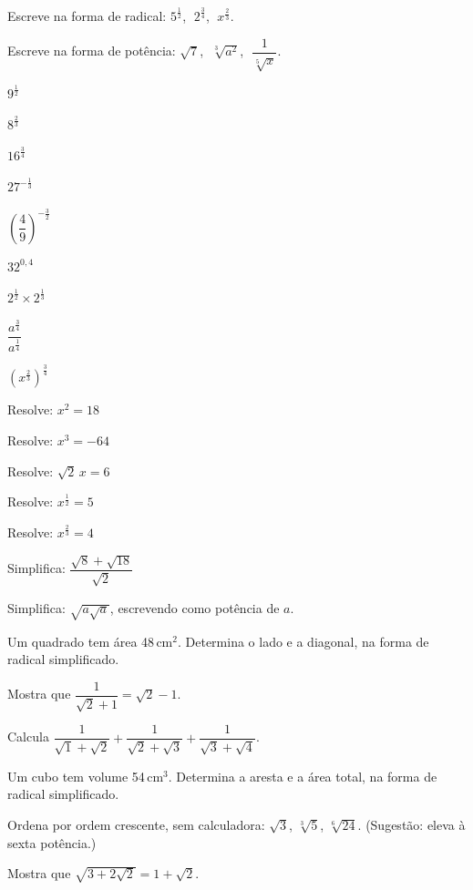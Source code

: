 \documentclass[12pt]{article}
\begin{document}
\begin{exercicios}
  \item Escreve na forma de radical: $5^{\frac{1}{2}}$, $\;2^{\frac{3}{4}}$, $\;x^{\frac{2}{3}}$.
  \item Escreve na forma de potência: $\sqrt{7}$, $\;\sqrt[3]{a^2}$, $\;\dfrac{1}{\sqrt[5]{x}}$.
  \item $9^{\frac{1}{2}}$
  \item $8^{\frac{2}{3}}$
  \item $16^{\frac{3}{4}}$
  \item $27^{-\frac{1}{3}}$
  \item $\left(\dfrac{4}{9}\right)^{-\frac{3}{2}}$
  \item $32^{0{,}4}$
  \item $2^{\frac{1}{2}} \times 2^{\frac{1}{3}}$
  \item $\dfrac{a^{\frac{3}{4}}}{a^{\frac{1}{4}}}$
  \item $\left(x^{\frac{2}{3}}\right)^{\frac{3}{4}}$
\end{exercicios}

\begin{exercicios}
  \item Resolve: $x^2 = 18$
  \item Resolve: $x^3 = -64$
  \item Resolve: $\sqrt{2}\,x = 6$
  \item Resolve: $x^{\frac{1}{2}} = 5$
  \item Resolve: $x^{\frac{2}{3}} = 4$
  \item Simplifica: $\dfrac{\sqrt{8} + \sqrt{18}}{\sqrt{2}}$
  \item Simplifica: $\sqrt{a\sqrt{a}}$, escrevendo como potência de $a$.
\end{exercicios}

\begin{exercicios}
  \item Um quadrado tem área 48\,cm$^2$. Determina o lado e a diagonal, na forma de radical simplificado.
  \item Mostra que $\dfrac{1}{\sqrt{2} + 1} = \sqrt{2} - 1$.
  \item Calcula $\dfrac{1}{\sqrt{1} + \sqrt{2}} + \dfrac{1}{\sqrt{2} + \sqrt{3}} + \dfrac{1}{\sqrt{3} + \sqrt{4}}$.
  \item Um cubo tem volume 54\,cm$^3$. Determina a aresta e a área total, na forma de radical simplificado.
  \item Ordena por ordem crescente, sem calculadora: $\sqrt{3}$, $\sqrt[3]{5}$, $\sqrt[6]{24}$. (Sugestão: eleva à sexta potência.)
  \item Mostra que $\sqrt{3 + 2\sqrt{2}} = 1 + \sqrt{2}$.
\end{exercicios}
\end{document}

